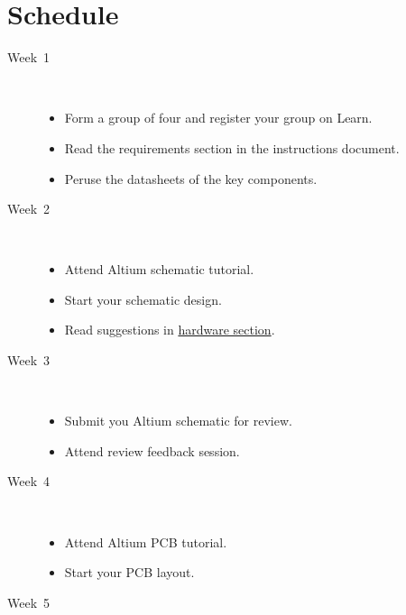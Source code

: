 \chapter{Schedule}

\begin{description}
\item [Week~1]\mbox{}\\

  \begin{itemize}
  \item Form a group of four and register your group on Learn.
  \item Read the requirements section in the instructions document.
  \item Peruse the datasheets of the key components.
  \end{itemize}

\item [Week~2]\mbox{}\\

  \begin{itemize}
  \item Attend Altium schematic tutorial.
  \item Start your schematic design.
  \item Read suggestions in \hyperref[hardware]{hardware section}.
  \end{itemize}

\item [Week~3]\mbox{}\\

  \begin{itemize}
  \item Submit you Altium schematic for review.
  \item Attend review feedback session.
  \end{itemize}

\item [Week~4]\mbox{}\\

  \begin{itemize}
  \item Attend Altium PCB tutorial.
  \item Start your PCB layout.
  \end{itemize}


\item [Week~5]\mbox{}\\


\end{description}
